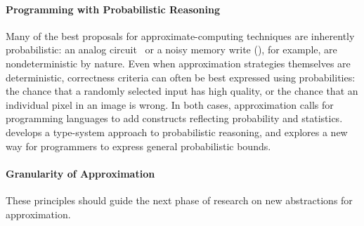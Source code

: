 \paragraph{Programming with Probabilistic Reasoning}
Many of the best proposals for approximate-computing techniques are inherently
probabilistic:
an analog circuit~\cite{anpu} or a noisy memory write (),
for example, are nondeterministic by nature.
Even when approximation strategies themselves are deterministic, correctness
criteria can often be best expressed using probabilities: the chance that a
randomly selected input has high quality, or the chance that an individual
pixel in an image is wrong.
In both cases, approximation calls for programming languages to add constructs
reflecting probability and statistics.
 develops a type-system approach to probabilistic reasoning,
and  explores a new way for programmers to express
general probabilistic bounds.

\paragraph{Granularity of Approximation}

These principles should guide the next phase of research on new abstractions
for approximation.
